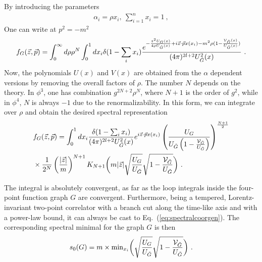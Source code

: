 \documentclass[a4paper,11pt]{article}
\begin{document}
By introducing the parameters
\begin{align}
\alpha_i=\rho x_i, \ \sum_{i=1}^nx_i=1 \ , 
\end{align}
One can write at $p^2=-m^2$
\begin{align}
f_G(\vec{z},\vec{p})=\int_0^{\infty} d\rho \rho^{N}\int_0^1 d x_i \delta(1-\sum_ix_i) \frac{e^{-\frac{z^2 U_G(x)}{4\rho U_{\tilde G}(x)}+i\vec{z}\cdot \vec{p}x(x_i)-m^2\rho(1-\frac{{\cal V}_{\tilde G}(x)}{U_{\tilde G}(x)})}}{(4\pi)^{2l+2}U^2_{\tilde G}(x)} \ .
\end{align}
Now, the polynomials $U(x)$ and $V(x)$ are obtained from the $\alpha$ dependent versions by removing the overall factors of $\rho$. The number $N$ depends on the theory. In $\phi^3$, one has combination $g^{2N+2}\rho^{N}$, where $N+1$ is the order of $g^2$, while in $\phi^4$, $N$ is always $-1$ due to the renormalizability.  In this form, we can integrate over $\rho$ and obtain the desired spectral representation
\begin{align}
&f_G(\vec{z},\vec{p})=\int_0^1 dx_i \frac{\delta(1-\sum_ix_i)}{(4\pi)^{2l+2}U^2_{\tilde G}(x)} e^{i\vec{z}\cdot \vec{p}x(x_i)} \left(\frac{U_G}{U_{\tilde G}\left(1-\frac{{\cal V}_{\tilde G}}{U_{\tilde G}}\right)}\right)^{\frac{N+1}{2}} \nonumber \\ 
&\times \frac{1}{2^N}\left(\frac{|\vec{z}|}{m}\right)^{N+1}K_{N+1}\bigg(m|\vec{z}|\sqrt{\frac{U_G}{U_{\tilde G}}}\sqrt{1-\frac{{\cal V}_{\tilde G}}{U_{\tilde G}}}\bigg) \ .
\end{align}

The integral is absolutely convergent, as far as the loop integrals inside the four-point function graph $G$ are convergent. Furthermore, being a tempered, Lorentz-invariant two-point correlator with a branch cut along the time-like axis and with a power-law bound, it can always be cast to Eq.~(\ref{eq:spectralcoorgen}). The corresponding spectral minimal for the graph $G$ is then
\begin{align}
s_0(G)=m\times {\rm min}_{x_i}\bigg(\sqrt{\frac{U_G}{U_{\tilde G}}}\sqrt{1-\frac{{\cal V}_{\tilde G}}{U_{\tilde G}}}\bigg) \ .
\end{align}
\end{document}
